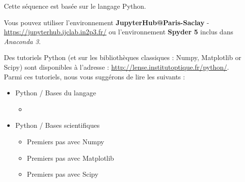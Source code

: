 Cette séquence est basée sur le langage Python.

Vous pouvez utiliser l'environnement \textbf{JupyterHub@Paris-Saclay} - 
\href{https://jupyterhub.ijclab.in2p3.fr/}{https://jupyterhub.ijclab.in2p3.fr/} ou l'environnement \textbf{Spyder 5} inclus dans \textit{Anaconda 3}.

Des tutoriels Python (et sur les bibliothèques classiques : Numpy, Matplotlib or Scipy) sont disponibles à l'adresse : \href{http://lense.institutoptique.fr/python/}{http://lense.institutoptique.fr/python/}. Parmi ces tutoriels, nous vous suggérons de lire les suivants :

\begin{itemize}
	\item Python / Bases du langage
	\begin{itemize}
		\item 
	\end{itemize}
	\item Python / Bases scientifiques
	\begin{itemize}
		\item Premiers pas avec Numpy
		\item Premiers pas avec Matplotlib
		\item Premiers pas avec Scipy
	\end{itemize}
\end{itemize}
